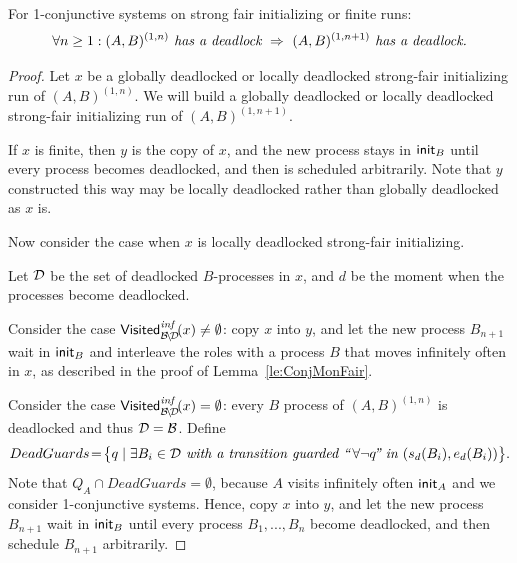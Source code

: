 \begin{lemma} \label{le:FairConjunctiveMonotonicityLemmaDeadlocks}
For 1-conjunctive systems on strong fair initializing or finite runs:
$$
\forall n\geq 1: (A,B)^{(1,n)} \textit{ has a deadlock}
\ \Impl\ 
(A,B)^{(1,n+1)} \textit{ has a deadlock.}
$$
\end{lemma}
\begin{proof}
Let $x$ be a globally deadlocked or locally deadlocked strong-fair initializing run of $(A,B)^{(1,n)}$.
We will build a globally deadlocked or locally deadlocked strong-fair initializing run 
of $(A,B)^{(1,n+1)}$.

If $x$ is finite, then $y$ is the copy of $x$, and the new process stays in ${\sf init}_B$
until every process becomes deadlocked, and then is scheduled arbitrarily.
Note that $y$ constructed this way may be locally deadlocked 
rather than globally deadlocked as $x$ is.

Now consider the case when $x$ is locally deadlocked strong-fair initializing.

Let $\mathcal{D}$ be the set of deadlocked $B$-processes in $x$, and $d$ be the moment 
when the processes become deadlocked.

Consider the case $\mathsf{Visited}^{\textit{inf}}_{\mathcal{B}\!\setminus\!\mathcal{D}}\!(x) \neq \emptyset$:
copy $x$ into $y$, and let the new process $B_{n+1}$ wait in ${\sf init}_B$ 
and interleave the roles with a process $B$ that moves infinitely often in $x$, 
as described in the proof of Lemma~\ref{le:ConjMonFair}.

Consider the case $\mathsf{Visited}^{\textit{inf}}_{\mathcal{B}\!\setminus\!\mathcal{D}}\!(x) = \emptyset$:
every $B$ process of $(A,B)^{(1,n)}$ is deadlocked and thus $\mathcal{D} = \mathcal{B}$.
Define 
$$
DeadGuards\! =\! \big\{q \mid \exists B_i \in \mathcal{D}
                      \textit{ with a transition guarded ``\,}
                      {\forall \neg q} 
                      \textit{\!'' in } (s_d(B_i),e_d(B_i))\big\}.
$$
Note that $Q_A \cap DeadGuards = \emptyset$, because $A$ visits infinitely often ${\sf init}_A$
and we consider 1-conjunctive systems.
Hence, copy $x$ into $y$, and let the new process $B_{n+1}$ wait in ${\sf init}_B$ 
until every process $B_1,...,B_n$ become deadlocked, and then schedule $B_{n+1}$ arbitrarily.
%
\end{proof}


